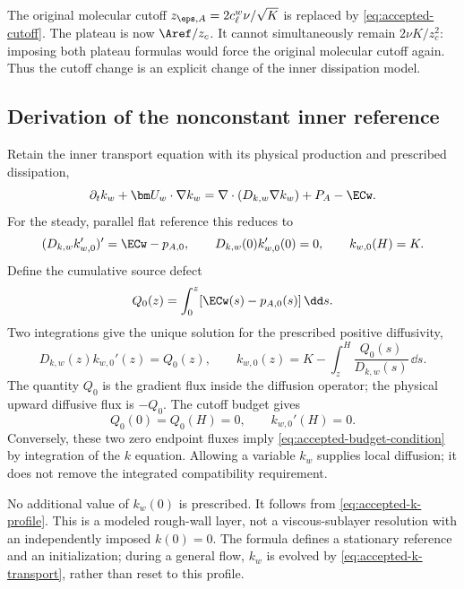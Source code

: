 The original molecular cutoff
$z_{\eps,A}=2c_\ell^w\nu/\sqrt K$ is replaced by
\cref{eq:accepted-cutoff}. The plateau is now $\Aref/z_c$.
It cannot simultaneously remain $2\nu K/z_c^2$: imposing both
plateau formulas would force the original molecular cutoff again.
Thus the cutoff change is an explicit change of the inner
dissipation model.

\subsection{Derivation of the nonconstant inner reference}
\label{app:accepted-awf-inner-k}

Retain the inner transport equation with its physical production
and prescribed dissipation,
\begin{equation}
 \partial_t k_w+\bm U_w\cdot\nabla k_w
 =\nabla\cdot(D_{k,w}\nabla k_w)+P_A-\ECw.
 \label{eq:accepted-k-transport}
\end{equation}
For the steady, parallel flat reference this reduces to
\begin{equation}
 (D_{k,w}k_{w,0}')'=\ECw-p_{A,0},\qquad
 D_{k,w}(0)k_{w,0}'(0)=0,\qquad k_{w,0}(H)=K.
 \label{eq:accepted-k-bvp}
\end{equation}
Define the cumulative source defect
\begin{equation}
 Q_0(z)=\int_0^z[\ECw(s)-p_{A,0}(s)]\,\dd s.
 \label{eq:accepted-Q}
\end{equation}
Two integrations give the unique solution for the prescribed
positive diffusivity,
\begin{equation}
 \boxed{D_{k,w}(z)k_{w,0}'(z)=Q_0(z),\qquad
 k_{w,0}(z)=K-\int_z^H\frac{Q_0(s)}{D_{k,w}(s)}\,\dd s.}
 \label{eq:accepted-k-profile}
\end{equation}
The quantity $Q_0$ is the gradient flux inside the diffusion
operator; the physical upward diffusive flux is $-Q_0$.
The cutoff budget gives
\begin{equation}
 Q_0(0)=Q_0(H)=0,\qquad k_{w,0}'(H)=0.
 \label{eq:accepted-endpoint-fluxes}
\end{equation}
Conversely, these two zero endpoint fluxes imply
\cref{eq:accepted-budget-condition} by integration of the $k$
equation. Allowing a variable $k_w$ supplies local diffusion; it
does not remove the integrated compatibility requirement.

No additional value of $k_w(0)$ is prescribed. It follows from
\cref{eq:accepted-k-profile}. This is a modeled rough-wall layer,
not a viscous-sublayer resolution with an independently imposed
$k(0)=0$. The formula defines a stationary reference and an
initialization; during a general flow, $k_w$ is evolved by
\cref{eq:accepted-k-transport}, rather than reset to this profile.

